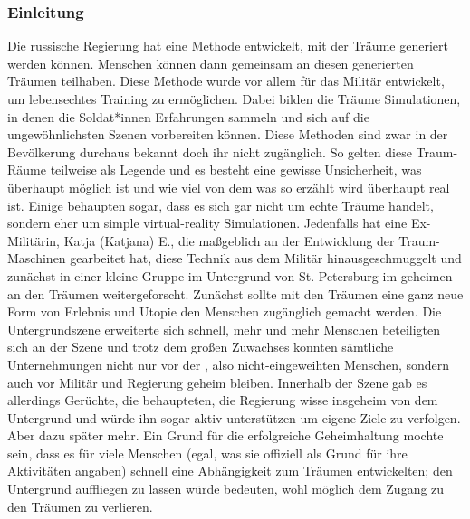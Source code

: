 \documentclass[12pt, a4paper, openany]{report}
\begin{document}
\subsubsection{Einleitung}
Die russische Regierung hat eine Methode entwickelt, mit der Träume generiert werden können.
Menschen können dann gemeinsam an diesen generierten Träumen teilhaben. 
Diese Methode wurde vor allem für das Militär entwickelt, um lebensechtes Training zu ermöglichen.
Dabei bilden die Träume Simulationen, in denen die Soldat*innen Erfahrungen sammeln und sich auf die ungewöhnlichsten Szenen vorbereiten können.
Diese Methoden sind zwar in der Bevölkerung durchaus bekannt doch ihr nicht zugänglich. 
So gelten diese Traum-Räume teilweise als Legende und es besteht eine gewisse Unsicherheit, was überhaupt möglich ist und wie viel von dem was so erzählt wird überhaupt real ist. 
Einige behaupten sogar, dass es sich gar nicht um echte Träume handelt, sondern eher um simple virtual-reality Simulationen. 
Jedenfalls hat eine Ex-Militärin, Katja (Katjana) E., die maßgeblich an der Entwicklung der Traum-Maschinen gearbeitet hat, diese Technik aus dem Militär hinausgeschmuggelt und zunächst in einer kleine Gruppe im Untergrund von St. Petersburg im geheimen an den Träumen weitergeforscht. 
Zunächst sollte mit den Träumen eine ganz neue Form von Erlebnis und Utopie den Menschen zugänglich gemacht werden. 
Die Untergrundszene erweiterte sich schnell, mehr und mehr Menschen beteiligten sich an der Szene und trotz dem großen Zuwachses konnten sämtliche Unternehmungen nicht nur vor der , also nicht-eingeweihten Menschen, sondern auch vor Militär und Regierung geheim bleiben. 
Innerhalb der Szene gab es allerdings Gerüchte, die behaupteten, die Regierung wisse insgeheim von dem Untergrund und würde ihn sogar aktiv unterstützen um eigene Ziele zu verfolgen. 
Aber dazu später mehr.
Ein Grund für die erfolgreiche Geheimhaltung mochte sein, dass es für viele Menschen (egal, was sie offiziell als Grund für ihre Aktivitäten angaben) schnell eine Abhängigkeit zum Träumen entwickelten; den Untergrund auffliegen zu lassen würde bedeuten, wohl möglich dem Zugang zu den Träumen zu verlieren.
\end{document}
